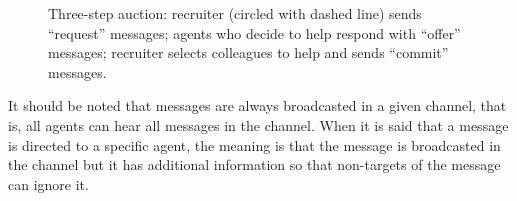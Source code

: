 \begin{figure}[ht]
  \centering

  \caption{Three-step auction:  recruiter (circled with dashed line) sends ``request'' messages;  agents who decide to help respond with ``offer'' messages;  recruiter selects colleagues to help and sends ``commit'' messages.}

 \label{fig:auction}
\end{figure}

It should be noted that messages are always broadcasted in a given channel, that is, all agents can hear all messages in the channel. When it is said that a message is directed to a specific agent, the meaning is that the message is broadcasted in the channel but it has additional information so that non-targets of the message can ignore it.

